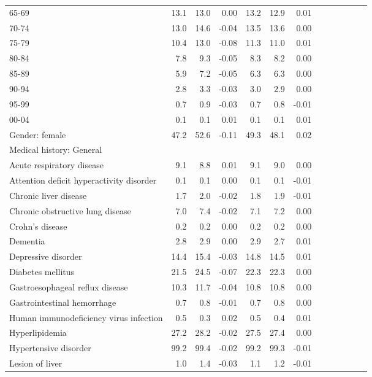 \documentclass[11pt,]{article}
\begin{document}
\begin{longtable}{lrrrrrrrrrrrr}
      65-69 & 13.1 & 13.0 &  0.00 & 13.2 & 12.9 &  0.01 \\ 
      70-74 & 13.0 & 14.6 & -0.04 & 13.5 & 13.6 &  0.00 \\ 
      75-79 & 10.4 & 13.0 & -0.08 & 11.3 & 11.0 &  0.01 \\ 
      80-84 &  7.8 &  9.3 & -0.05 &  8.3 &  8.2 &  0.00 \\ 
      85-89 &  5.9 &  7.2 & -0.05 &  6.3 &  6.3 &  0.00 \\ 
      90-94 &  2.8 &  3.3 & -0.03 &  3.0 &  2.9 &  0.00 \\ 
      95-99 &  0.7 &  0.9 & -0.03 &  0.7 &  0.8 & -0.01 \\ 
      00-04 &  0.1 &  0.1 &  0.01 &  0.1 &  0.1 &  0.01 \\ 
  Gender: female & 47.2 & 52.6 & -0.11 & 49.3 & 48.1 &  0.02 \\ 
  Medical history: General &    &    &     &    &    &     \\ 
      Acute respiratory disease &  9.1 &  8.8 &  0.01 &  9.1 &  9.0 &  0.00 \\ 
      Attention deficit hyperactivity disorder &  0.1 &  0.1 &  0.00 &  0.1 &  0.1 & -0.01 \\ 
      Chronic liver disease &  1.7 &  2.0 & -0.02 &  1.8 &  1.9 & -0.01 \\ 
      Chronic obstructive lung disease &  7.0 &  7.4 & -0.02 &  7.1 &  7.2 &  0.00 \\ 
      Crohn's disease &  0.2 &  0.2 &  0.00 &  0.2 &  0.2 &  0.00 \\ 
      Dementia &  2.8 &  2.9 &  0.00 &  2.9 &  2.7 &  0.01 \\ 
      Depressive disorder & 14.4 & 15.4 & -0.03 & 14.8 & 14.5 &  0.01 \\ 
      Diabetes mellitus & 21.5 & 24.5 & -0.07 & 22.3 & 22.3 &  0.00 \\ 
      Gastroesophageal reflux disease & 10.3 & 11.7 & -0.04 & 10.8 & 10.8 &  0.00 \\ 
      Gastrointestinal hemorrhage &  0.7 &  0.8 & -0.01 &  0.7 &  0.8 &  0.00 \\ 
      Human immunodeficiency virus infection &  0.5 &  0.3 &  0.02 &  0.5 &  0.4 &  0.01 \\ 
      Hyperlipidemia & 27.2 & 28.2 & -0.02 & 27.5 & 27.4 &  0.00 \\ 
      Hypertensive disorder & 99.2 & 99.4 & -0.02 & 99.2 & 99.3 & -0.01 \\ 
      Lesion of liver &  1.0 &  1.4 & -0.03 &  1.1 &  1.2 & -0.01 \\ 

\end{longtable}
\end{document}
